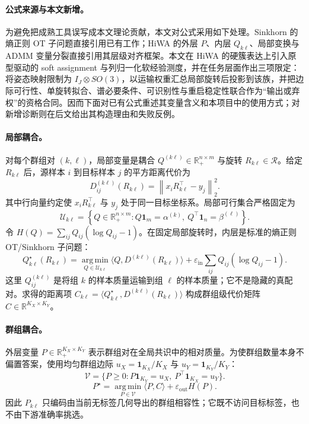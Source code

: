 \documentclass[10pt,a4paper,fontset=windows]{ctexart}
\newcommand{\RR}{\mathbb{R}}
\newcommand{\norm}[1]{\left\lVert #1\right\rVert}
\newcommand{\argmin}{\operatorname*{arg\,min}}
\theoremstyle{definition}
\theoremstyle{remark}
\begin{document}
\paragraph{公式来源与本文新增。} 为避免把成熟工具误写成本文理论贡献，本文对公式采用如下处理。Sinkhorn 的熵正则 OT 子问题直接引用已有工作\cite{cuturi2013sinkhorn,peyre2019computational}；HiWA 的外层 $P$、内层 $Q_{k\ell}$、局部变换与 ADMM 变量分裂直接引用其层级对齐框架\cite{lee2019hierarchical}。本文在 HiWA 的硬簇表达上引入原型驱动的 soft assignment 与列归一化软经验测度，并在任务层面作出三项限定：将姿态映射限制为 $I_J\otimes SO(3)$，以运输权重汇总局部旋转后投影到该族，并把边际可行性、单旋转拟合、谱必要条件、可识别性与重启稳定性联合作为“输出或弃权”的资格合同。因而下面对已有公式重述其变量含义和本项目中的使用方式；对新增诊断则在后文给出其构造理由和失败反例。

\paragraph{局部耦合。} 对每个群组对 $(k,\ell)$，局部变量是耦合 $Q^{(k\ell)}\in\RR_+^{n\times m}$ 与旋转 $R_{k\ell}\in\mathcal R$。给定 $R_{k\ell}$ 后，源样本 $i$ 到目标样本 $j$ 的平方距离代价为
\begin{equation}
D_{ij}^{(k\ell)}(R_{k\ell})=
\norm{x_iR_{k\ell}^\top-y_j}_2^2.
\label{eq:local-cost}
\end{equation}
其中行向量约定使 $x_iR_{k\ell}^\top$ 与 $y_j$ 处于同一目标坐标系。局部可行集合严格固定为
\begin{equation}
\mathcal U_{k\ell}=
\left\{Q\in\RR_+^{n\times m}:Q\bm1_m=\alpha^{(k)},\ Q^\top\bm1_n=\beta^{(\ell)}\right\}.
\label{eq:local-polytope}
\end{equation}
令 $H(Q)=\sum_{ij}Q_{ij}(\log Q_{ij}-1)$。在固定局部旋转时，内层是标准的熵正则 OT/Sinkhorn 子问题\cite{cuturi2013sinkhorn,peyre2019computational}：
\begin{equation}
Q_{k\ell}^\star(R_{k\ell})=
\argmin_{Q\in\mathcal U_{k\ell}}
\langle Q,D^{(k\ell)}(R_{k\ell})\rangle
+\varepsilon_{\mathrm{in}}\sum_{ij}Q_{ij}(\log Q_{ij}-1).
\label{eq:inner-ot}
\end{equation}
这里 $Q_{ij}^{(k\ell)}$ 是将组 $k$ 的样本质量运输到组 $\ell$ 的样本质量；它不是隐藏的真配对。求得的距离项 $C_{k\ell}=\langle Q_{k\ell}^\star,D^{(k\ell)}(R_{k\ell})\rangle$ 构成群组级代价矩阵 $C\in\RR^{K_X\times K_Y}$。

\paragraph{群组耦合。} 外层变量 $P\in\RR_+^{K_X\times K_Y}$ 表示群组对在全局共识中的相对质量。为使群组数量本身不偏置答案，使用均匀群组边际 $u_X=\bm1_{K_X}/K_X$ 与 $u_Y=\bm1_{K_Y}/K_Y$：
\begin{equation}
\mathcal V=\{P\ge0:P\bm1_{K_Y}=u_X,\ P^\top\bm1_{K_X}=u_Y\}.
\label{eq:group-polytope}
\end{equation}
\begin{equation}
P^\star=
\argmin_{P\in\mathcal V}\langle P,C\rangle+\varepsilon_{\mathrm{out}}H(P).
\label{eq:outer-ot}
\end{equation}
因此 $P_{k\ell}$ 只编码由当前无标签几何导出的群组相容性；它既不访问目标标签，也不由下游准确率挑选。
\end{document}
